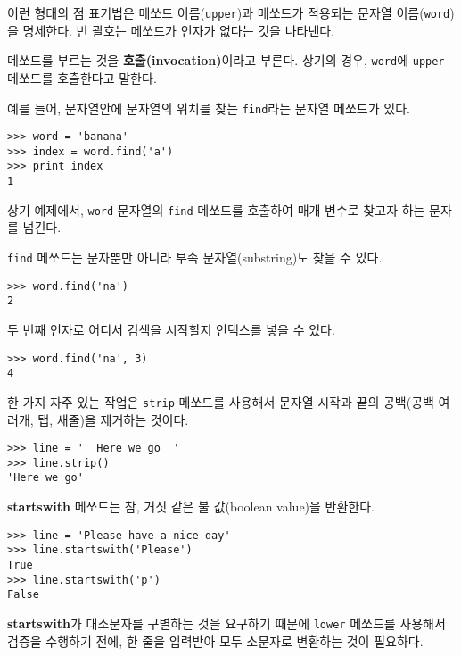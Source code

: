 이런 형태의 점 표기법은 메쏘드 이름({\tt upper})과 메쏘드가 적용되는 문자열 이름({\tt word})을 명세한다.
빈 괄호는 메쏘드가 인자가 없다는 것을 나타낸다.


메쏘드를 부르는 것을 {\bf 호출(invocation)}이라고 부른다. 
상기의 경우, {\tt word}에 {\tt upper} 메쏘드를 호출한다고 말한다.


예를 들어, 문자열안에 문자열의 위치를 찾는 {\tt find}라는 문자열 메쏘드가 있다.

\beforeverb
\begin{verbatim}
>>> word = 'banana'
>>> index = word.find('a')
>>> print index
1
\end{verbatim}
\afterverb
%

상기 예제에서, {\tt word} 문자열의 {\tt find} 메쏘드를 호출하여 매개 변수로 찾고자 하는 문자를 넘긴다.

{\tt find} 메쏘드는 문자뿐만 아니라 부속 문자열(substring)도 찾을 수 있다.

\beforeverb
\begin{verbatim}
>>> word.find('na')
2
\end{verbatim}
\afterverb
%

두 번째 인자로 어디서 검색을 시작할지 인텍스를 넣을 수 있다.


\beforeverb
\begin{verbatim}
>>> word.find('na', 3)
4
\end{verbatim}
\afterverb
%

한 가지 자주 있는 작업은 {\tt strip} 메쏘드를 사용해서 문자열 시작과 끝의 공백(공백 여러개, 탭, 새줄)을 제거하는 것이다.

\beforeverb
\begin{verbatim}
>>> line = '  Here we go  '
>>> line.strip()
'Here we go'
\end{verbatim}
\afterverb
%

{\bf startswith} 메쏘드는 참, 거짓 같은 불 값(boolean value)을 반환한다.

\beforeverb
\begin{verbatim}
>>> line = 'Please have a nice day'
>>> line.startswith('Please')
True
>>> line.startswith('p')
False
\end{verbatim}
\afterverb
%

{\bf startswith}가 대소문자를 구별하는 것을 요구하기 때문에 {\tt lower} 메쏘드를 사용해서 검증을 수행하기 전에, 
한 줄을 입력받아 모두 소문자로 변환하는 것이 필요하다.

